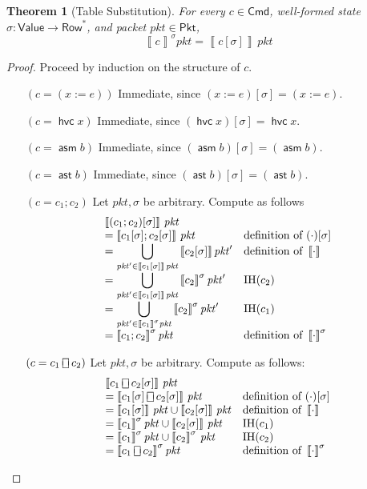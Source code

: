 \documentclass{article}
\newcommand{\pkt}{\mathit{pkt}}
\newcommand{\denote}[1]{\left\llbracket#1\right\rrbracket}
\newcommand{\Value}{\mathsf{Value}}
\newcommand{\Cmd}{\mathsf{Cmd}}
\newcommand{\Pkt}{\mathsf{Pkt}}
\newcommand{\Row}{\mathsf{Row}}
\newcommand{\assert}{\mathop{\mathsf{ast}}}
\newcommand{\assume}{\mathop{\mathsf{asm}}}
\newcommand{\choiceop}{\rotatebox[origin=c]{90}{$\sqsubset\!\!\!\sqsupset$}}
\newcommand{\choice}{\mathbin{\choiceop}}
\newcommand{\havoc}[1]{\mathop{\mathsf{hvc}}#1}
\theoremstyle{plain}
\newtheorem{theorem}{Theorem}
\theoremstyle{definition}
\theoremstyle{remark}
\begin{document}
\begin{theorem}[Table Substitution]
  \label{thm:subst}
  For every $c \in \Cmd$, well-formed state $\sigma : \Value \to \Row^*$, and
  packet $\pkt \in \Pkt$,
  \[\denote{c}^\sigma\pkt = \denote{c[\sigma]}\,\pkt\]
\end{theorem}
\begin{proof}
   Proceed by induction on the structure of $c$.
  \begin{enumerate}[align=left]
    \item[$(c = (x := e))$] Immediate, since $(x:=e)[\sigma] = (x:=e)$.

    \item[$(c = \havoc x)$] Immediate, since $(\havoc x)[\sigma] = \havoc x$.

    \item[$(c = \assume b)$] Immediate, since $(\assume b)[\sigma] = (\assume b)$.

    \item[$(c = \assert b)$] Immediate, since $(\assert b)[\sigma] = (\assert b)$.


    \item[$(c = c_1;c_2)$] Let $\pkt,\sigma$ be arbitrary. Compute as follows
      \[\begin{array}{ >{\displaystyle}l l}
        \denote{(c_1;c_2)[\sigma]}\,\pkt \\
        = \denote{c_1[\sigma];c_2[\sigma]}\,\pkt  & \text{definition of } (\cdot)[\sigma]\\
        = \bigcup_{\pkt' \in \denote{c_1[\sigma]}\,\pkt} \denote{c_2[\sigma]}\pkt' & \text{definition of } \denote{\cdot}\\
        = \bigcup_{\pkt' \in \denote{c_1[\sigma]}\,\pkt} \denote{c_2}^\sigma\pkt' & \text{IH}(c_2) \\
        = \bigcup_{\pkt' \in \denote{c_1}^\sigma\pkt} \denote{c_2}^\sigma\pkt' & \text{IH}(c_1) \\
        = \denote{c_1;c_2}^\sigma\pkt & \text{definition of } \denote{\cdot}^\sigma
      \end{array}\]

    \item[$(c = c_1 \choice c_2)$] Let $\pkt, \sigma$ be arbitrary. Compute as follows:
      \[ \begin{array}{>{\displaystyle}ll}
          \denote{c_1\choice c_2[\sigma]}\,\pkt\\
          = \denote{c_1[\sigma] \choice c_2[\sigma]}\,\pkt & \text{definition of } (\cdot)[\sigma]\\
          = \denote{c_1[\sigma]}\,\pkt \cup \denote{c_2[\sigma]}\,\pkt & \text{definition of } \denote{\cdot}\\
          = \denote{c_1}^\sigma\pkt \cup \denote{c_2[\sigma]}\,\pkt & \text{IH}(c_1)\\
          = \denote{c_1}^\sigma\pkt \cup \denote{c_2}^\sigma\,\pkt & \text{IH}(c_2)\\
          = \denote{c_1\choice c_2}^\sigma\pkt & \text{definition of } \denote{\cdot}^\sigma
          \end{array}
      \]


\end{enumerate}
\end{proof}
\end{document}
